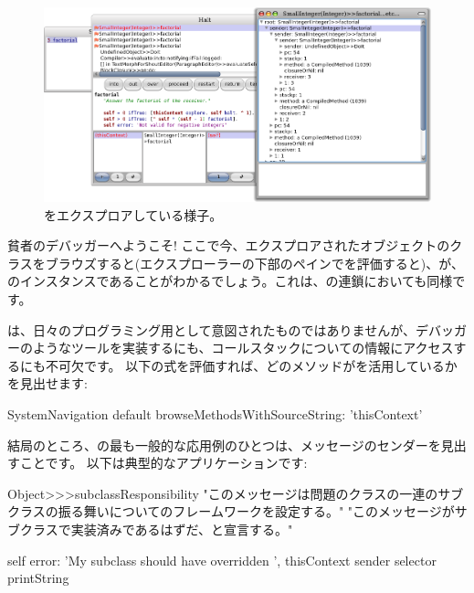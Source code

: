 \documentclass[a4paper,10pt,twoside]{book}
\begin{document}
\begin{figure}[ht]\centering
	\includegraphics[width=\linewidth]{exploringThisContext}
	\caption{をエクスプロアしている様子。}
\end{figure}

貧者のデバッガーへようこそ!
ここで今、エクスプロアされたオブジェクトのクラスをブラウズすると(\ie エクスプローラーの下部のペインでを評価すると)、が、のインスタンスであることがわかるでしょう。これは、の連鎖においても同様です。

は、日々のプログラミング用として意図されたものではありませんが、デバッガーのようなツールを実装するにも、コールスタックについての情報にアクセスするにも不可欠です。
以下の式を評価すれば、どのメソッドがを活用しているかを見出せます:

\begin{code}{}
SystemNavigation default browseMethodsWithSourceString: 'thisContext'
\end{code}

結局のところ、の最も一般的な応用例のひとつは、メッセージのセンダーを見出すことです。
以下は典型的なアプリケーションです: %
\begin{code}{}
Object>>>subclassResponsibility
	"このメッセージは問題のクラスの一連のサブクラスの振る舞いについてのフレームワークを設定する。"
	"このメッセージがサブクラスで実装済みであるはずだ、と宣言する。"

	self error: 'My subclass should have overridden ', thisContext sender selector printString
\end{code}
\end{document}
